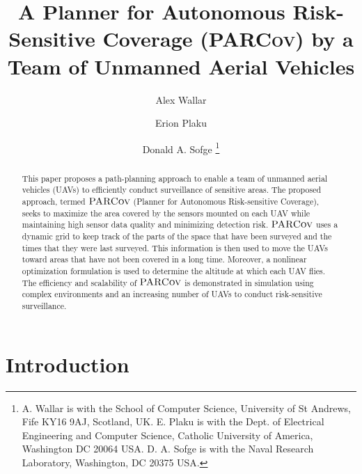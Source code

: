 \documentclass[letterpaper, 10pt, conference]{ieeeconf}
\newcommand{\Function}[1]{\ensuremath{{ \textsc{#1}}}}
\newcommand{\Name}{\Function{\small{PARCov}}}
\begin{document}
\title{A Planner for Autonomous Risk-Sensitive Coverage
  (\textsc{PARCov}) by a\\
Team of Unmanned Aerial Vehicles}


\author{Alex Wallar \and Erion Plaku \and Donald A. Sofge
\thanks{A. Wallar is with the School of Computer Science,
  University of St Andrews, Fife KY16 9AJ, Scotland, UK. E. Plaku is with the
  Dept. of Electrical Engineering and Computer Science, Catholic
  University of America, Washington DC 20064 USA. D. A. Sofge is with
  the Naval Research Laboratory, Washington, DC 20375 USA.
}}


\maketitle
\begin{abstract}

This paper proposes a path-planning approach to enable a team of
unmanned aerial vehicles (UAVs) to efficiently conduct surveillance of
sensitive areas. The proposed approach, termed $\Name$ (Planner for
Autonomous Risk-sensitive Coverage), seeks to maximize the area covered by the
sensors mounted on each UAV while maintaining high sensor data quality
and minimizing detection risk.  $\Name$ uses a dynamic grid to keep
track of the parts of the space that have been surveyed and the times
that they were last surveyed. This information is then used to move
the UAVs toward areas that have not been covered in a long time.
Moreover, a nonlinear optimization formulation is used to determine
the altitude at which each UAV flies. The efficiency and scalability
of $\Name$ is demonstrated in simulation using complex environments
and an increasing number of UAVs to conduct risk-sensitive
surveillance.

\end{abstract}


\section{Introduction}
\label{sec:Intro}




\end{document}
